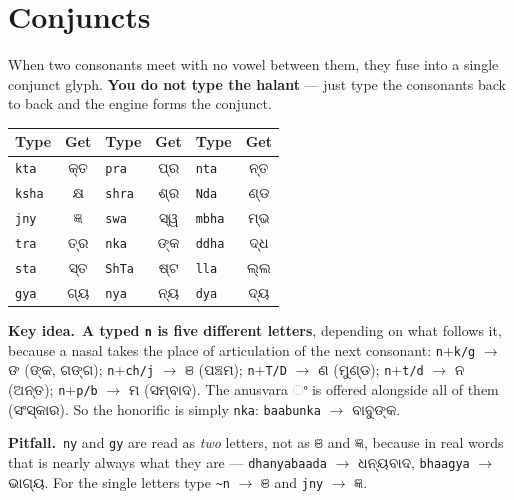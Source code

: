 \documentclass[11pt, a4paper]{article}
\newcommand{\od}[1]{{\odiafont #1}}          %
\newcommand{\odb}[1]{{\odiafont\large #1}}   %
\newcommand{\kidea}{{\color{midseagreen}\textbf{\textsf{Key idea.}}}\ }
\newcommand{\kpit}{{\color{midseaorange!85!black}\textbf{\textsf{Pitfall.}}}\ }
\begin{document}
\section{Conjuncts}

When two consonants meet with no vowel between them, they fuse into a single conjunct
glyph. \textbf{You do not type the halant} --- just type the consonants back to back and
the engine forms the conjunct.

\begin{center}
\begin{tabular}{l c l c l c}
\toprule
Type & Get & Type & Get & Type & Get \\
\midrule
\texttt{kta}  & \odb{କ୍ତ} & \texttt{pra}  & \odb{ପ୍ର} & \texttt{nta}  & \odb{ନ୍ତ} \\
\texttt{ksha} & \odb{କ୍ଷ} & \texttt{shra} & \odb{ଶ୍ର} & \texttt{Nda}  & \odb{ଣ୍ଡ} \\
\texttt{jny}  & \odb{ଜ୍ଞ} & \texttt{swa}  & \odb{ସ୍ୱ} & \texttt{mbha} & \odb{ମ୍ଭ} \\
\texttt{tra}  & \odb{ତ୍ର} & \texttt{nka}  & \odb{ଙ୍କ} & \texttt{ddha} & \odb{ଦ୍ଧ} \\
\texttt{sta}  & \odb{ସ୍ତ} & \texttt{ShTa} & \odb{ଷ୍ଟ} & \texttt{lla}  & \odb{ଲ୍ଲ} \\
\texttt{gya}  & \odb{ଗ୍ୟ} & \texttt{nya}  & \odb{ନ୍ୟ} & \texttt{dya}  & \odb{ଦ୍ୟ} \\
\bottomrule
\end{tabular}
\end{center}

\begin{keybox}
\kidea \textbf{A typed \texttt{n} is five different letters}, depending on what
follows it, because a nasal takes the place of articulation of the next consonant:
\texttt{n}+\texttt{k/g} \(\rightarrow\) \od{ଙ} (\od{ଙ୍କ}, \od{ଗଙ୍ଗ});
\texttt{n}+\texttt{ch/j} \(\rightarrow\) \od{ଞ} (\od{ପଞ୍ଚମ});
\texttt{n}+\texttt{T/D} \(\rightarrow\) \od{ଣ} (\od{ମୁଣ୍ଡ});
\texttt{n}+\texttt{t/d} \(\rightarrow\) \od{ନ} (\od{ଅନ୍ତ});
\texttt{n}+\texttt{p/b} \(\rightarrow\) \od{ମ} (\od{ସମ୍ବାଦ}).
The anusvara \od{ଂ} is offered alongside all of them (\od{ସଂସ୍କାର}).
So the honorific is simply \texttt{nka}: \texttt{baabunka} \(\rightarrow\) \od{ବାବୁଙ୍କ}.
\end{keybox}

\begin{warnbox}
\kpit \texttt{ny} and \texttt{gy} are read as \emph{two} letters, not as \od{ଞ} and
\od{ଜ୍ଞ}, because in real words that is nearly always what they are ---
\texttt{dhanyabaada} \(\rightarrow\) \od{ଧନ୍ୟବାଦ}, \texttt{bhaagya} \(\rightarrow\)
\od{ଭାଗ୍ୟ}. For the single letters type \texttt{\textasciitilde n} \(\rightarrow\) \od{ଞ}
and \texttt{jny} \(\rightarrow\) \od{ଜ୍ଞ}.
\end{warnbox}
\end{document}

